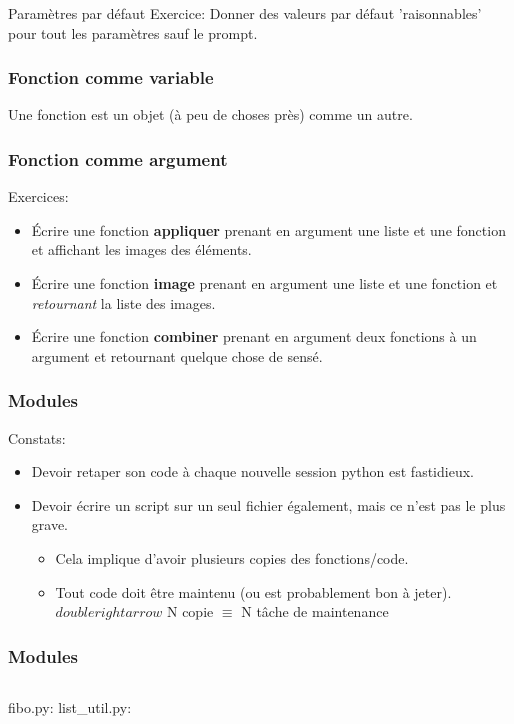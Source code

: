 \documentclass{beamer}
\begin{document}
\begin{frame}{Paramètres par défaut}
  Exercice: Donner des valeurs par défaut 'raisonnables' pour tout les paramètres sauf le prompt.
\end{frame}

\begin{frame}[fragile]\frametitle{Fonction comme variable}
  Une fonction est un objet (à peu de choses près) comme un autre.
  \fbox{}
\end{frame}

\begin{frame}[fragile]\frametitle{Fonction comme argument}
  Exercices:
  \begin{itemize}
  \item Écrire une fonction {\bf appliquer} prenant en argument une liste et une fonction et affichant les images des éléments.
  \item Écrire une fonction {\bf image} prenant en argument une liste et une fonction et {\em retournant} la liste des images.
  \item Écrire une fonction {\bf combiner} prenant en argument deux fonctions à un argument et retournant quelque chose de sensé.
  \end{itemize}
\end{frame}

\begin{frame}[fragile]\frametitle{Modules}
  Constats:
  \begin{itemize}
  \item Devoir retaper son code à chaque nouvelle session python est fastidieux.
  \item Devoir écrire un script sur un seul fichier également, mais ce n'est pas le plus grave.
    \begin{itemize}
    \item Cela implique d'avoir plusieurs copies des fonctions/code.
    \item Tout code doit être maintenu (ou est probablement bon à jeter). \linebreak
      $doublerightarrow$ N copie $\equiv$ N tâche de maintenance
    \end{itemize}
  \end{itemize}
\end{frame}

\begin{frame}[fragile]\frametitle{Modules}
  \begin{columns}
    fibo.py:
    \newline
    \fbox{}
    list\_util.py:
    \newline
    \fbox{}
  \end{columns}
  \fbox{}
\end{frame}
\end{document}
